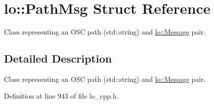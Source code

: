 \hypertarget{structlo_1_1PathMsg}{\section{lo\+:\+:Path\+Msg Struct Reference}
\label{structlo_1_1PathMsg}
}


Class representing an O\+S\+C path (std\+::string) and \hyperlink{classlo_1_1Message}{lo\+::\+Message} pair.  




\subsection{Detailed Description}
Class representing an O\+S\+C path (std\+::string) and \hyperlink{classlo_1_1Message}{lo\+::\+Message} pair. 

Definition at line 943 of file lo\+\_\+cpp.\+h.

